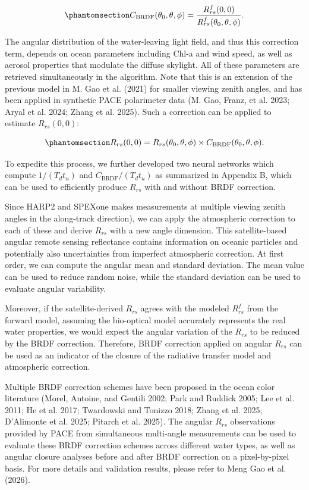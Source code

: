 \documentclass[
  letterpaper,
  open=any]{scrbook}
\begin{document}
\begin{equation}\phantomsection\label{eq-cbrdf}{
C_{\mathrm{BRDF}}(\theta_0,\theta,\phi)
=
\frac{R^f_{rs}(0,0)}
{R^f_{rs}(\theta_0,\theta,\phi)}.
}\end{equation}

The angular distribution of the water-leaving light field, and thus this
correction term, depends on ocean parameters including Chl-a and wind
speed, as well as aerosol properties that modulate the diffuse skylight.
All of these parameters are retrieved simultaneously in the algorithm.
Note that this is an extension of the previous model in M. Gao et al.
(2021) for smaller viewing zenith angles, and has been applied in
synthetic PACE polarimeter data (M. Gao, Franz, et al. 2023; Aryal et
al. 2024; Zhang et al. 2025). Such a correction can be applied to
estimate \(R_{rs}(0,0)\):

\begin{equation}\phantomsection\label{eq-rrs00}{
R_{rs}(0,0)
=
R_{rs}(\theta_0,\theta,\phi)
\times
C_{\mathrm{BRDF}}(\theta_0,\theta,\phi).
}\end{equation}

To expedite this process, we further developed two neural networks which
compute \(1/(T_d t_u)\) and \(C_{\mathrm{BRDF}}/(T_d t_u)\) as
summarized in Appendix B, which can be used to efficiently produce
\(R_{rs}\) with and without BRDF correction.

Since HARP2 and SPEXone makes measurements at multiple viewing zenith
angles in the along-track direction), we can apply the atmospheric
correction to each of these and derive \(R_{rs}\) with a new angle
dimension. This satellite-based angular remote sensing reflectance
contains information on oceanic particles and potentially also
uncertainties from imperfect atmospheric correction. At first order, we
can compute the angular mean and standard deviation. The mean value can
be used to reduce random noise, while the standard deviation can be used
to evaluate angular variability.

Moreover, if the satellite-derived \(R_{rs}\) agrees with the modeled
\(R^f_{rs}\) from the forward model, assuming the bio-optical model
accurately represents the real water properties, we would expect the
angular variation of the \(R_{rs}\) to be reduced by the BRDF
correction. Therefore, BRDF correction applied on angular \(R_{rs}\) can
be used as an indicator of the closure of the radiative transfer model
and atmospheric correction.

Multiple BRDF correction schemes have been proposed in the ocean color
literature (Morel, Antoine, and Gentili 2002; Park and Ruddick 2005; Lee
et al. 2011; He et al. 2017; Twardowski and Tonizzo 2018; Zhang et al.
2025; D'Alimonte et al. 2025; Pitarch et al. 2025). The angular
\(R_{rs}\) observations provided by PACE from simultaneous multi-angle
measurements can be used to evaluate these BRDF correction schemes
across different water types, as well as angular closure analyses before
and after BRDF correction on a pixel-by-pixel basis. For more details
and validation results, please refer to Meng Gao et al. (2026).
\end{document}

